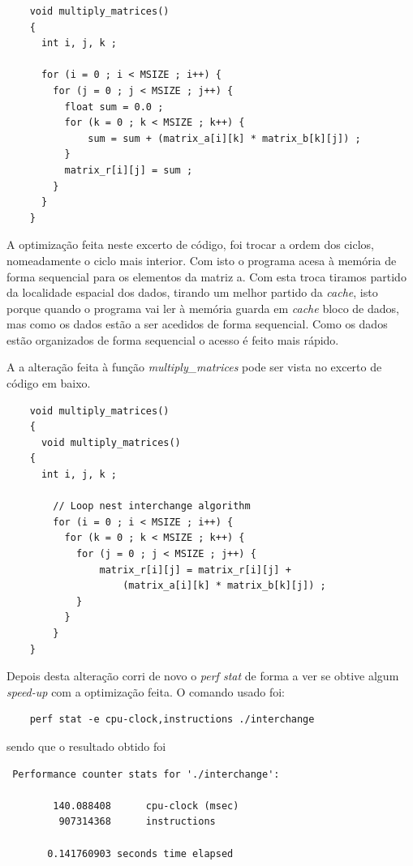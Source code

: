\documentclass[conference,compsoc]{IEEEtran}
\begin{document}
\begin{lstlisting}
	void multiply_matrices()
    {
      int i, j, k ;

      for (i = 0 ; i < MSIZE ; i++) {
        for (j = 0 ; j < MSIZE ; j++) {
          float sum = 0.0 ;
          for (k = 0 ; k < MSIZE ; k++) {
              sum = sum + (matrix_a[i][k] * matrix_b[k][j]) ;
          }
          matrix_r[i][j] = sum ;
        }
      }
    }
\end{lstlisting}

A optimização feita neste excerto de código, foi trocar a ordem dos ciclos, nomeadamente o ciclo mais interior. Com isto o programa acesa à memória de forma sequencial para os elementos da matriz a. Com esta troca tiramos partido da localidade espacial dos dados, tirando um melhor partido da \textit{cache}, isto porque quando o programa vai ler à memória guarda em \textit{cache} bloco de dados, mas como os dados estão a ser acedidos de forma sequencial. Como os dados estão organizados de forma sequencial o acesso é feito mais rápido.

A a alteração feita à função \textit{multiply\_matrices} pode ser vista no excerto de código em baixo.

\begin{lstlisting}
	void multiply_matrices()
    {
      void multiply_matrices()
    {
      int i, j, k ;

        // Loop nest interchange algorithm
        for (i = 0 ; i < MSIZE ; i++) {
          for (k = 0 ; k < MSIZE ; k++) {
            for (j = 0 ; j < MSIZE ; j++) {
                matrix_r[i][j] = matrix_r[i][j] +
                    (matrix_a[i][k] * matrix_b[k][j]) ;
    	    }
          }
        }
    }
\end{lstlisting}

Depois desta alteração corri de novo o \textit{perf stat} de forma a ver se obtive algum \textit{speed-up} com a optimização feita. O comando usado foi:

\begin{lstlisting}
	perf stat -e cpu-clock,instructions ./interchange
\end{lstlisting}

sendo que o resultado obtido foi

\begin{lstlisting}
 Performance counter stats for './interchange':

        140.088408      cpu-clock (msec)                                            
         907314368      instructions             

       0.141760903 seconds time elapsed
\end{lstlisting}
\end{document}
